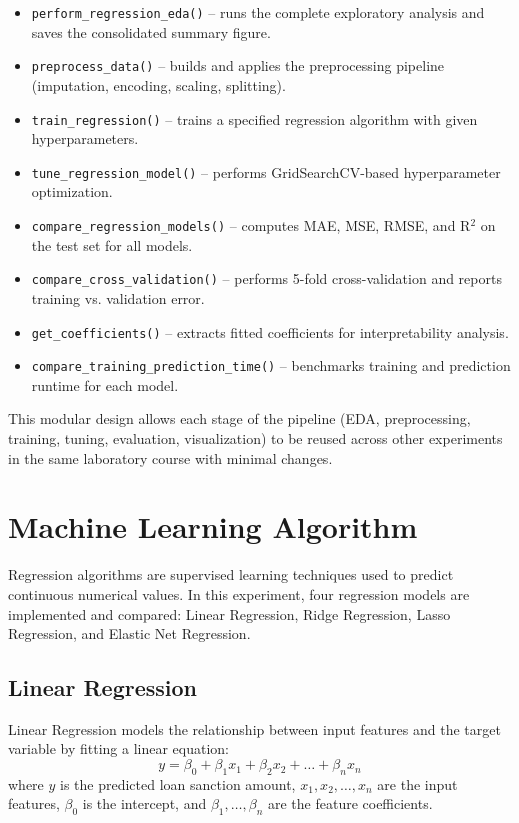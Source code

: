 \documentclass[12pt,a4paper]{article}
\begin{document}
\begin{itemize}
\item \texttt{perform\_regression\_eda()} -- runs the complete exploratory analysis and saves the consolidated summary figure.
\item \texttt{preprocess\_data()} -- builds and applies the preprocessing pipeline (imputation, encoding, scaling, splitting).
\item \texttt{train\_regression()} -- trains a specified regression algorithm with given hyperparameters.
\item \texttt{tune\_regression\_model()} -- performs GridSearchCV-based hyperparameter optimization.
\item \texttt{compare\_regression\_models()} -- computes MAE, MSE, RMSE, and R$^2$ on the test set for all models.
\item \texttt{compare\_cross\_validation()} -- performs 5-fold cross-validation and reports training vs. validation error.
\item \texttt{get\_coefficients()} -- extracts fitted coefficients for interpretability analysis.
\item \texttt{compare\_training\_prediction\_time()} -- benchmarks training and prediction runtime for each model.
\end{itemize}

This modular design allows each stage of the pipeline (EDA, preprocessing, training, tuning, evaluation, visualization) to be reused across other experiments in the same laboratory course with minimal changes.

\section{Machine Learning Algorithm}

Regression algorithms are supervised learning techniques used to predict continuous numerical values. In this experiment, four regression models are implemented and compared: Linear Regression, Ridge Regression, Lasso Regression, and Elastic Net Regression.

\subsection{Linear Regression}

Linear Regression models the relationship between input features and the target variable by fitting a linear equation:
\[
y = \beta_0 + \beta_1 x_1 + \beta_2 x_2 + \dots + \beta_n x_n
\]
where $y$ is the predicted loan sanction amount, $x_1, x_2, \dots, x_n$ are the input features, $\beta_0$ is the intercept, and $\beta_1, \dots, \beta_n$ are the feature coefficients.
\end{document}
